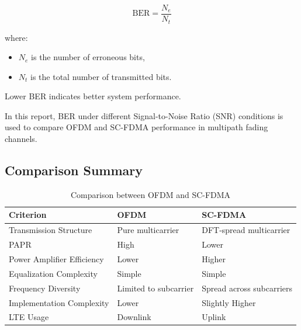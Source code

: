 \begin{equation}
\mathrm{BER}
=
\frac{N_e}{N_t}
\end{equation}

where:
\begin{itemize}
    \item $N_e$ is the number of erroneous bits,
    \item $N_t$ is the total number of transmitted bits.
\end{itemize}

Lower BER indicates better system performance.

In this report, BER under different Signal-to-Noise Ratio (SNR)
conditions is used to compare OFDM and SC-FDMA performance in multipath
fading channels.

\subsection{Comparison Summary}

\begin{table}[H]
\centering
\caption{Comparison between OFDM and SC-FDMA}
\begin{tabularx}{\textwidth}
{|>{\raggedright\arraybackslash}X|
 >{\centering\arraybackslash}X|
 >{\centering\arraybackslash}X|}
\hline
\textbf{Criterion} & \textbf{OFDM} & \textbf{SC-FDMA} \\ \hline

Transmission Structure
& Pure multicarrier
& DFT-spread multicarrier \\ \hline

PAPR
& High
& Lower \\ \hline

Power Amplifier Efficiency
& Lower
& Higher \\ \hline

Equalization Complexity
& Simple
& Simple \\ \hline

Frequency Diversity
& Limited to subcarrier
& Spread across subcarriers \\ \hline

Implementation Complexity
& Lower
& Slightly Higher \\ \hline

LTE Usage
& Downlink
& Uplink \\ \hline

\end{tabularx}
\end{table}

